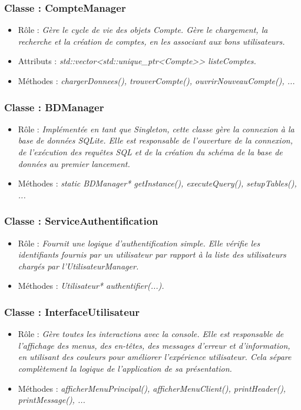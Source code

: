 \subsubsection{Classe : CompteManager}
\begin{itemize}[leftmargin=*]
\item Rôle : \textit{Gère le cycle de vie des objets Compte. Gère le chargement, la recherche et la création de comptes, en les associant aux bons utilisateurs.}
\item Attributs : \textit{std::vector<std::unique\_ptr<Compte>> listeComptes.}
\item Méthodes : \textit{chargerDonnees(), trouverCompte(), ouvrirNouveauCompte(), ...}
\end{itemize}

\subsubsection{Classe : BDManager}
\begin{itemize}[leftmargin=*]
\item Rôle : \textit{Implémentée en tant que Singleton, cette classe gère la connexion à la base de données SQLite. Elle est responsable de l'ouverture de la connexion, de l'exécution des requêtes SQL et de la création du schéma de la base de données au premier lancement.}
\item Méthodes : \textit{static BDManager* getInstance(), executeQuery(), setupTables(), ...}
\end{itemize}

\subsubsection{Classe : ServiceAuthentification}
\begin{itemize}[leftmargin=*]
\item Rôle : \textit{Fournit une logique d'authentification simple. Elle vérifie les identifiants fournis par un utilisateur par rapport à la liste des utilisateurs chargés par l'UtilisateurManager.}
\item Méthodes : \textit{Utilisateur* authentifier(...).}
\end{itemize}

\subsubsection{Classe : InterfaceUtilisateur}
\begin{itemize}[leftmargin=*]
\item Rôle : \textit{Gère toutes les interactions avec la console. Elle est responsable de l'affichage des menus, des en-têtes, des messages d'erreur et d'information, en utilisant des couleurs pour améliorer l'expérience utilisateur. Cela sépare complètement la logique de l'application de sa présentation.}
\item Méthodes : \textit{afficherMenuPrincipal(), afficherMenuClient(), printHeader(), printMessage(), ...}
\end{itemize}

